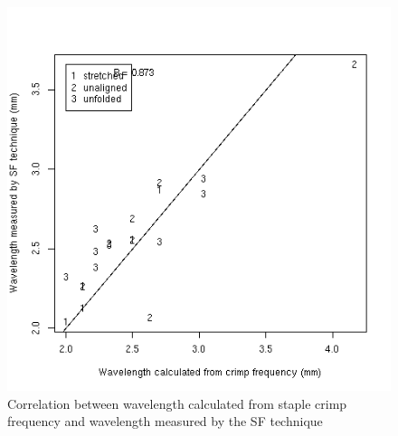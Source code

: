 %

\begin{figure}[!hb]
  \centering
  \includegraphics[width=1.0\textwidth]{figcrimpwavlsf.png}
  \caption{Correlation between wavelength calculated from staple crimp frequency and wavelength measured by the SF technique}
  \label{fig:crimpwavlsf}
\end{figure}

%

